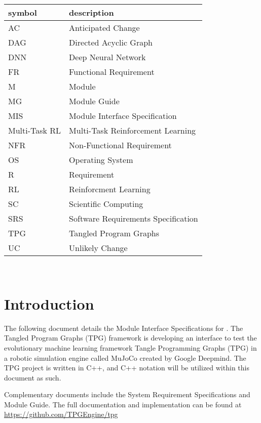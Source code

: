 \documentclass[12pt, titlepage]{article}
\begin{document}
\renewcommand{\arraystretch}{1.2}
\begin{tabular}{l l} 
  \toprule		
  \textbf{symbol} & \textbf{description}\\
  \midrule 
  AC & Anticipated Change\\
  DAG & Directed Acyclic Graph \\
  DNN & Deep Neural Network \\
  FR & Functional Requirement \\
  M & Module \\
  MG & Module Guide \\
  MIS & Module Interface Specification \\
  Multi-Task RL & Multi-Task Reinforcement Learning \\
  NFR & Non-Functional Requirement \\
  OS & Operating System \\
  R & Requirement\\
  RL & Reinforcment Learning \\
  SC & Scientific Computing \\
  SRS & Software Requirements Specification \\
  TPG & Tangled Program Graphs\\
  UC & Unlikely Change \\
  \bottomrule
\end{tabular}\\

\newpage

\tableofcontents

\newpage


\section{Introduction}

The following document details the Module Interface Specifications for
\progname{}. The Tangled Program Graphs (TPG) framework is developing an interface to test the evolutionary machine learning framework Tangle Programming Graphs (TPG) in a robotic simulation engine called MuJoCo created by Google Deepmind.
The TPG project is written in C++, and C++ notation will be utilized within this document as such.



Complementary documents include the System Requirement Specifications
and Module Guide.  The full documentation and implementation can be
found at \url{https://github.com/TPGEngine/tpg} 
\end{document}
